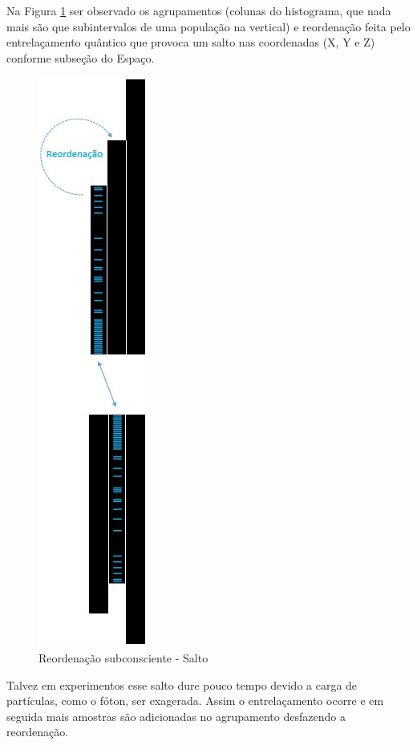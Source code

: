 Na Figura \ref{fig:consciousness_space_subconscious_observation_jump} ser observado os agrupamentos (colunas do histograma, que nada mais são que subintervalos de uma população na vertical) e reordenação feita pelo entrelaçamento quântico que provoca um salto nas coordenadas (X, Y e Z) conforme subseção do Espaço.
\begin{figure}[H]
\caption{Reordenação subconsciente - Salto}
\label{fig:consciousness_space_subconscious_observation_jump}
\centering
\includegraphics[scale=.6]{sections/images/consciousness_space_subconscious_observation_jump.jpg}
\end{figure}

Talvez em experimentos esse salto dure pouco tempo devido a carga de partículas, como o fóton, ser exagerada. Assim o entrelaçamento ocorre e em seguida mais amostras são adicionadas no agrupamento desfazendo a reordenação. 

